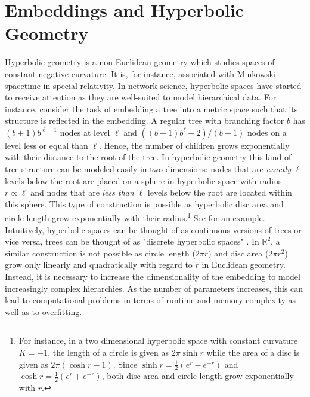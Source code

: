 \documentclass[11pt]{article}
\newcommand{\R}{\mathbb{R}}
\begin{document}
\section{Embeddings and Hyperbolic Geometry}
\label{sec:hyperbolic}
Hyperbolic geometry is a non-Euclidean geometry which studies spaces of constant
negative curvature. It is, for instance, associated with Minkowski spacetime in
special relativity. In network science, hyperbolic spaces have started to
receive attention as they are well-suited to model hierarchical data. For
instance, consider the task of embedding a tree into a metric space such that
its structure is reflected in the embedding. A regular tree with branching
factor \(b\) has \((b + 1)b^{\ell-1}\) nodes at level \(\ell\) and \(((b + 1)b^\ell - 2) /
(b - 1)\) nodes on a level less or equal than \(\ell\). Hence, the number of children
grows exponentially with their distance to the root of the tree. In hyperbolic
geometry this kind of tree structure can be modeled easily in two dimensions:
nodes that are \emph{exactly} \(\ell\) levels below the root are placed on a sphere in
hyperbolic space with radius \(r \propto \ell\) and nodes that are \emph{less than} \(\ell\) levels
below the root are located within this sphere. This type of construction is
possible as hyperbolic disc area and circle length grow exponentially with their
radius.\footnote{For instance, in a two dimensional hyperbolic space with constant
curvature \(K=-1\), the length of a circle is given as \(2 \pi \sinh r\) while the
area of a disc is given as \(2\pi (\cosh r - 1)\). Since \(\sinh r =
\frac{1}{2}(e^r - e^{-r})\) and \(\cosh r = \frac{1}{2}(e^r + e^{-r})\), both disc
area and circle length grow exponentially with \(r\).} See
 for an example. Intuitively, hyperbolic spaces
can be thought of as continuous versions of trees or vice versa, trees can be
thought of as "discrete hyperbolic spaces"
\cite{hyperbolic/krioukov2010hyperbolic}. In \(\R^2\), a similar construction is not
possible as circle length (\(2\pi r\)) and disc area (\(2\pi r^2\)) grow only linearly
and quadratically with regard to \(r\) in Euclidean geometry. Instead, it is
necessary to increase the dimensionality of the embedding to model increasingly
complex hierarchies. As the number of parameters increases, this can lead to
computational problems in terms of runtime and memory complexity as well as to
overfitting.
\end{document}
